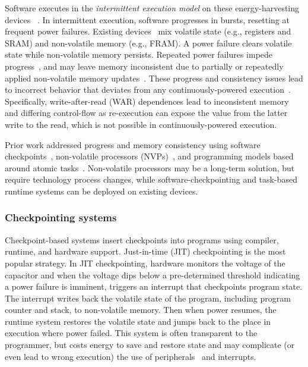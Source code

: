 Software executes in the {\em intermittent execution model} on these
energy-harvesting devices ~\cite{mementos,dino,dewdrop,quickrecall,idetic,jerger2017ehmodel}.
% 
In intermittent execution, software progresses in bursts, resetting
at frequent power failures.
% 
Existing devices~\cite{wolverine,msp430fr5994} mix volatile state (e.g., registers and SRAM) and non-volatile memory (e.g., FRAM). 
% 
A power failure clears volatile state while non-volatile memory persists.
%
Repeated power failures impede progress~\cite{mementos}, and may leave memory
inconsistent due to partially or repeatedly applied non-volatile memory
updates~\cite{dino}.
% 
These progress and consistency issues lead to incorrect
behavior that deviates from any continuously-powered execution~\cite{edb}.
% 
Specifically, write-after-read (WAR) dependences lead to inconsistent memory and differing control-flow as re-execution can expose the value from the latter write to the read, which is not possible in continuously-powered execution.

Prior work addressed progress and memory consistency using software
checkpoints~\cite{dino,ratchet,clank}, non-volatile processors (NVPs)~\cite{nvp,ma2017incidental},
and programming models based around atomic tasks~\cite{chain,alpaca,mayfly,alpaca}.
% 
Non-volatile processors may be a long-term solution, but require technology process changes, while software-checkpointing and task-based runtime systems can be deployed on existing devices.

\subsubsection{Checkpointing systems}
Checkpoint-based systems insert checkpoints into programs using compiler, runtime, and hardware support.
% 
Just-in-time (JIT) checkpointing is the most popular strategy.
% 
In JIT checkpointing, hardware monitors the voltage of the capacitor and when the voltage dips below a pre-determined threshold indicating a power failure is imminent, triggers an interrupt that checkpoints program state. 
% 
The interrupt writes back the volatile state of the program, including program counter and stack, to non-volatile memory.
% 
Then when power resumes, the runtime system restores the volatile state and jumps back to the place in execution where power failed.
% 
This system is often transparent to the programmer, but costs energy to save and restore state and may complicate (or even lead to wrong execution) the use of peripherals~\cite{surbatovich2021automatically} and interrupts.

